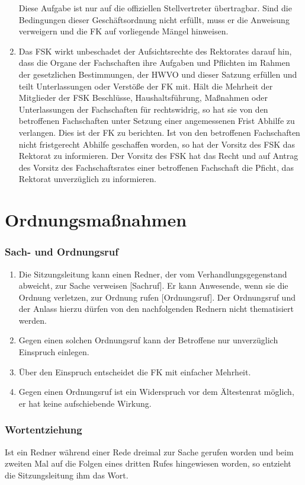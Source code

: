 \documentclass{article}
\begin{document}
\begin{enumerate}[(1)]
    	Diese Aufgabe ist nur auf die offiziellen Stellvertreter übertragbar. 
    	Sind die Bedingungen dieser Geschäftsordnung nicht erfüllt, muss er die Anweisung verweigern und die FK auf vorliegende Mängel hinweisen.
    \item Das FSK wirkt unbeschadet der Aufsichtsrechte des Rektorates darauf hin, dass die Organe der Fachschaften ihre Aufgaben und Pflichten im Rahmen der gesetzlichen Bestimmungen, der HWVO und dieser Satzung erfüllen und teilt Unterlassungen oder Verstöße der FK mit. 
    	Hält die Mehrheit der Mitglieder der FSK Beschlüsse, Haushaltsführung, Maßnahmen oder Unterlassungen der Fachschaften für rechtswidrig, so hat sie von den betroffenen Fachschaften unter Setzung einer angemessenen Frist Abhilfe zu verlangen.
    	Dies ist der FK zu berichten. 
    	Ist von den betroffenen Fachschaften nicht fristgerecht Abhilfe geschaffen worden, so hat der Vorsitz des FSK das Rektorat zu informieren.
    	Der Vorsitz des FSK hat das Recht und auf Antrag des Vorsitz des Fachschaftsrates einer betroffenen Fachschaft die Pficht, das Rektorat unverzüglich zu informieren.
\end{enumerate}

\part{Ordnungsmaßnahmen}
\section{Sach- und Ordnungsruf}
\begin{enumerate}[(1)]
    \item Die Sitzungsleitung kann einen Redner, der vom Verhandlungsgegenstand abweicht, zur Sache verweisen [Sachruf]. 
    Er kann Anwesende, wenn sie die Ordnung verletzen, zur Ordnung rufen [Ordnungsruf]. 
    Der Ordnungsruf und der Anlass hierzu dürfen von den nachfolgenden Rednern nicht thematisiert werden.
    \item Gegen einen solchen Ordnungsruf kann der Betroffene nur unverzüglich Einspruch einlegen.
    \item Über den Einspruch entscheidet die FK mit einfacher Mehrheit.
    \item Gegen einen Ordnungsruf ist ein Widerspruch vor dem Ältestenrat möglich, er hat keine aufschiebende Wirkung.
\end{enumerate}

\section{Wortentziehung}
Ist ein Redner während einer Rede dreimal zur Sache gerufen worden und beim zweiten Mal auf die Folgen eines dritten Rufes hingewiesen worden, so entzieht die Sitzungsleitung ihm das Wort.
\end{document}
